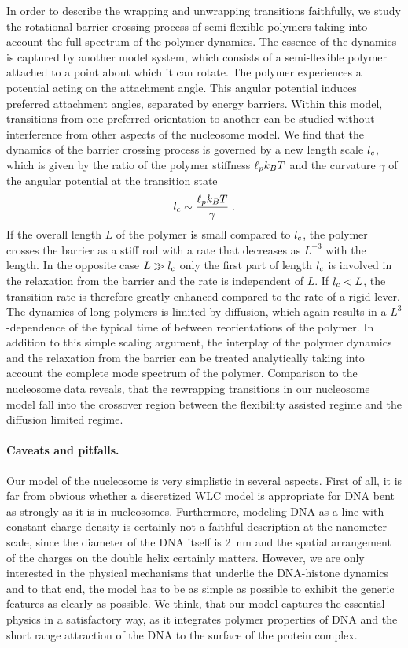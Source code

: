 In order to describe the wrapping and unwrapping transitions faithfully, we study the rotational 
barrier crossing process of semi-flexible polymers taking into account the full spectrum of the
polymer dynamics. The essence of the dynamics is captured by another model system, which consists 
of a semi-flexible polymer attached to a point about which it can rotate. The polymer experiences a potential acting 
on the attachment angle. This angular potential induces preferred attachment angles, separated
by energy barriers. Within this model, transitions from one preferred orientation to another can be studied without
interference from other aspects of the nucleosome model. We find that the dynamics of the barrier
crossing process is governed by a new length scale ${l_c}$, which is given by the ratio of the polymer stiffness
${\ell_p}k_BT$ and the curvature $\gamma$ of the angular potential at the transition state
\begin{equation}
\label{eq:crossoverlength}
{l_c}\sim\frac{{\ell_p}k_BT}{\gamma}\;.
\end{equation}
If the overall length $L$ of the polymer is small compared to ${l_c}$, the polymer crosses the barrier
as a stiff rod with a rate that decreases as $L^{-3}$ with the length. In the opposite case $L\gg {l_c}$
only the first part of length ${l_c}$ is involved in the relaxation from the barrier and the rate is independent
of $L$. If ${l_c}<L$, the transition rate is therefore greatly enhanced compared to the rate of a rigid lever.
The dynamics of long polymers is limited by diffusion, which again results in a 
$L^{3}$-dependence of the typical time of between reorientations of the polymer. 
In addition to this simple scaling argument, the interplay of the polymer dynamics and the relaxation 
from the barrier can be treated analytically taking into account the complete mode spectrum of the polymer. 
Comparison to the nucleosome data reveals, that the rewrapping transitions in our nucleosome model fall into the
crossover region between the flexibility assisted regime and the  diffusion limited regime.

\paragraph{Caveats and pitfalls.}
Our model of the nucleosome is very simplistic in several aspects. First of all, it is far from 
obvious whether a discretized WLC model is appropriate for DNA bent as strongly as it is 
in nucleosomes. Furthermore, modeling DNA as a line with constant charge density
is certainly not a faithful description at the nanometer scale, since the diameter of the DNA
itself is 2~nm and the spatial arrangement of the charges on the double helix certainly matters.
However, we are only interested in the physical mechanisms that underlie the DNA-histone dynamics
and to  that end, the model has to be as simple as possible to exhibit the generic features as
clearly as possible. We think, that our model captures the essential physics in a satisfactory 
way, as it integrates polymer properties of DNA and the short range attraction of the DNA
to the surface of the protein complex. 

